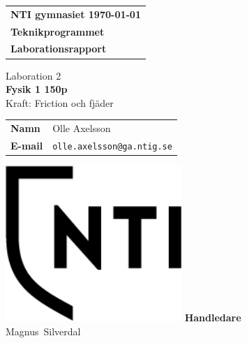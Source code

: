 \documentclass[11p, titlepage, oneside, a4paper]{article}
\makeatletter
\def\inst{Teknikprogrammet}
\def\typeofdoc{Laborationsrapport}
\def\course{Fysik 1 150p}
\def\pretitle{Laboration 2}
\def\title{Kraft: Friction och fjäder}
\def\name{Olle Axelsson}
\def\username{olle.axelsson}
\def\email{\username{}@ga.ntig.se}
\def\graders{Magnus Silverdal}
\makeatother
\begin{document}
\begin{titlepage}
		\thispagestyle{empty}
		\begin{large}
			\begin{tabular}{@{}p{\textwidth}@{}}
				\textbf{NTI gymnasiet \hfill \today} \\
				\textbf{\inst} \\
				\textbf{\typeofdoc} \\
			\end{tabular}
		\end{large}
		\vspace{10mm}
		\begin{center}
			\LARGE{\pretitle} \\
			\huge{\textbf{\course}}\\
			\vspace{10mm}
			\LARGE{\title} \\
			\vspace{15mm}
			\begin{large}
				\begin{tabular}{ll}
					\textbf{Namn} & \name \\
					\textbf{E-mail} & \texttt{\email} \\
				\end{tabular}
			\end{large}
			\vfill
            \includegraphics[width=0.5\textwidth]{images/NTI Gymnasiet_Symbol_print_svart.png}
			\vfill
            \large{\textbf{Handledare}}\\
			\mbox{\large{\graders}}
		\end{center}
	\end{titlepage}

    \begin{otherlanguage}{english}
	\begin{abstract}
        The point of this laboration was to measure the fricton of a piece of wood on a plank with different weights on.
        We will also measure the Elongation of a spring- with different weights on.
    \end{abstract}
    \end{otherlanguage}
	\tableofcontents
	
\end{document}
